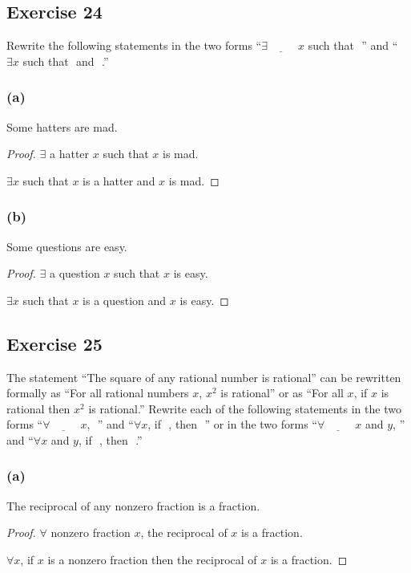 \documentclass[14pt]{extarticle}
\newcommand{\fbl}{\underline{\hspace{1cm}}\,\,}
\newcommand{\fa}{\forall}
\newcommand{\te}{\exists}
\begin{document}
\subsection{Exercise 24}
Rewrite the following statements in the two forms “$\te \fbl x$ such that \fbl” and “$\te x$ such that \fbl and \fbl.”

\subsubsection{(a)}
Some hatters are mad.

\begin{proof}
    $\te$ a hatter $x$ such that $x$ is mad.

    $\te x$ such that $x$ is a hatter and $x$ is mad.
\end{proof}

\subsubsection{(b)}
Some questions are easy.

\begin{proof}
    $\te$ a question $x$ such that $x$ is easy.

    $\te x$ such that $x$ is a question and $x$ is easy.
\end{proof}

\subsection{Exercise 25}
The statement “The square of any rational number is rational” can be rewritten formally as “For all rational numbers $x$, $x^2$ is rational” or as “For all $x$, if $x$ is rational then $x^2$ is rational.” Rewrite each of the following statements in the two forms “$\fa \fbl x$, \fbl” and “$\fa x$, if \fbl, then \fbl” or in the two forms “$\fa \fbl x$ and $y$, ”\fbl and “$\fa x$ and $y$, if \fbl, then \fbl.”

\subsubsection{(a)}
The reciprocal of any nonzero fraction is a fraction.

\begin{proof}
    $\fa$ nonzero fraction $x$, the reciprocal of $x$ is a fraction.

    $\fa x$, if $x$ is a nonzero fraction then the reciprocal of $x$ is a fraction.
\end{proof}
\end{document}
